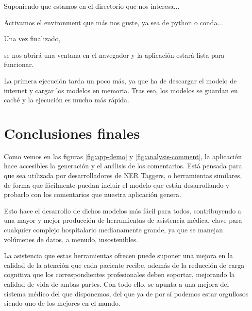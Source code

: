 Suponiendo que estamos en el directorio que nos interesa...


Activamos el environment que más nos guste, ya sea de python o conda...



Una vez finalizado, 


se nos abrirá una ventana en el navegador y la aplicación estará lista para funcionar.

La primera ejecución tarda un poco más, ya que ha de descargar el modelo de internet y cargar los modelos en memoria. Tras eso, los modelos se guardan en caché y la ejecución es mucho más rápida.

\section{Conclusiones finales}

Como vemos en las figuras \ref{fig:app-demo} y \ref{fig:analysis-comment}, la aplicación hace accesibles la generación y el análisis de los comentarios. Está pensada para que sea utilizada por desarrolladores de NER Taggers, o herramientas similares, de forma que fácilmente puedan incluir el modelo que están desarrollando y probarlo con los comentarios que nuestra aplicación genera.

Esto hace el desarrollo de dichos modelos más fácil para todos, contribuyendo a una mayor y mejor producción de herramientas de asistencia médica, clave para cualquier complejo hospitalario medianamente grande, ya que se manejan volúmenes de datos, a menudo, insostenibles.

La asistencia que estas herramientas ofrecen puede suponer una mejora en la calidad de la atención que cada paciente recibe, además de la reducción de carga cognitiva que los correspondientes profesionales deben soportar, mejorando la calidad de vida de ambas partes. Con todo ello, se apunta a una mejora del sistema médico del que disponemos, del que ya de por sí podemos estar orgullosos siendo uno de los mejores en el mundo.

